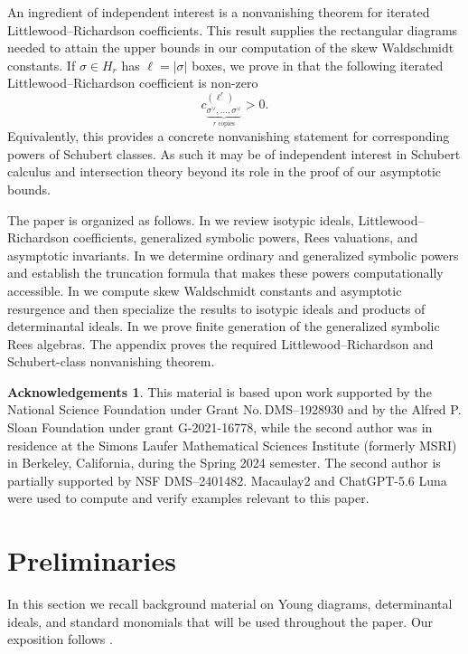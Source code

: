 \documentclass[11pt, reqno]{amsart}
\numberwithin{equation}{section}
\theoremstyle{definition}
\newtheorem*{acknowledgement}{Acknowledgements}
\begin{document}
An ingredient of independent interest is a nonvanishing theorem for
iterated Littlewood--Richardson coefficients. This result supplies the rectangular diagrams
needed to attain the upper bounds in our computation of the skew Waldschmidt
constants. If $\sigma\in H_r$ has
$\ell=|\sigma|$ boxes, we prove in  that the following  iterated Littlewood--Richardson coefficient is non-zero
\[
c_{\underbrace{\scriptstyle
\sigma^\vee,\ldots,\sigma^\vee}_{r\text{ copies}}}^{(\ell^r)}>0.
\]
Equivalently, this provides a concrete nonvanishing statement for corresponding powers of Schubert classes.   As such it may be of independent interest in Schubert calculus and intersection theory beyond its role in the proof of our asymptotic bounds.

The paper is organized as follows.  In  we review isotypic
ideals, Littlewood--Richardson coefficients, generalized symbolic powers,
Rees valuations, and asymptotic invariants.  In  we
determine ordinary and generalized symbolic powers and establish the
truncation formula that makes these powers computationally accessible.  In
 we compute skew Waldschmidt constants and asymptotic
resurgence and then specialize the results to isotypic ideals and products of
determinantal ideals.  In  we prove finite generation
of the generalized symbolic Rees algebras.  The appendix proves the required
Littlewood--Richardson and Schubert-class nonvanishing theorem.

\begin{acknowledgement}
		This material is based upon work supported by the National Science Foundation under Grant No.\,DMS--1928930 and by the Alfred P. Sloan Foundation under grant G-2021-16778, while the second author was in residence at the Simons Laufer Mathematical Sciences Institute (formerly MSRI) in Berkeley, California, during the Spring 2024 semester. The second author is partially supported by NSF DMS--2401482. Macaulay2 \cite{M2} and ChatGPT-5.6 Luna were used to compute and verify examples relevant to this paper.
	\end{acknowledgement}

\section{Preliminaries}\label{s: prelim}

In this section we recall background material on Young diagrams, determinantal ideals, and
standard monomials that will be used throughout the paper. Our exposition follows
\cite{deconcini1980young, bruns2006determinantal, bruns2022determinants, FULTON_TABLEAUX}.
\end{document}
